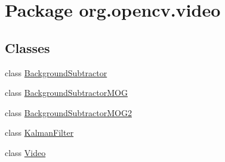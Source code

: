 \hypertarget{namespaceorg_1_1opencv_1_1video}{}\section{Package org.\+opencv.\+video}
\label{namespaceorg_1_1opencv_1_1video}
\subsection*{Classes}
\begin{DoxyCompactItemize}
\item 
class \mbox{\hyperlink{classorg_1_1opencv_1_1video_1_1_background_subtractor}{Background\+Subtractor}}
\item 
class \mbox{\hyperlink{classorg_1_1opencv_1_1video_1_1_background_subtractor_m_o_g}{Background\+Subtractor\+M\+OG}}
\item 
class \mbox{\hyperlink{classorg_1_1opencv_1_1video_1_1_background_subtractor_m_o_g2}{Background\+Subtractor\+M\+O\+G2}}
\item 
class \mbox{\hyperlink{classorg_1_1opencv_1_1video_1_1_kalman_filter}{Kalman\+Filter}}
\item 
class \mbox{\hyperlink{classorg_1_1opencv_1_1video_1_1_video}{Video}}
\end{DoxyCompactItemize}

